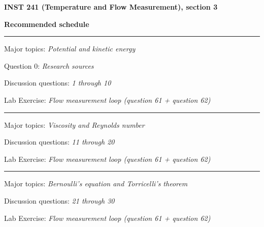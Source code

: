 
\centerline{\bf INST 241 (Temperature and Flow Measurement), section 3} \bigskip 
 
\vskip 10pt

\noindent
{\bf Recommended schedule}

\vskip 5pt

\hrule \vskip 5pt
\noindent
{}

\hskip 10pt Major topics: {\it Potential and kinetic energy}
 
\hskip 10pt Question 0: {\it Research sources}

\hskip 10pt Discussion questions: {\it 1 through 10}
 
\hskip 10pt Lab Exercise: {\it Flow measurement loop (question 61 + question 62)}



\vskip 10pt
\hrule \vskip 5pt
\noindent
{}

\hskip 10pt Major topics: {\it Viscosity and Reynolds number}
 
\hskip 10pt Discussion questions: {\it 11 through 20}
 
\hskip 10pt Lab Exercise: {\it Flow measurement loop (question 61 + question 62)}
 



\vskip 10pt
\hrule \vskip 5pt
\noindent
{}

\hskip 10pt Major topics: {\it Bernoulli's equation and Torricelli's theorem}
 
\hskip 10pt Discussion questions: {\it 21 through 30}
 
\hskip 10pt Lab Exercise: {\it Flow measurement loop (question 61 + question 62)}
 



